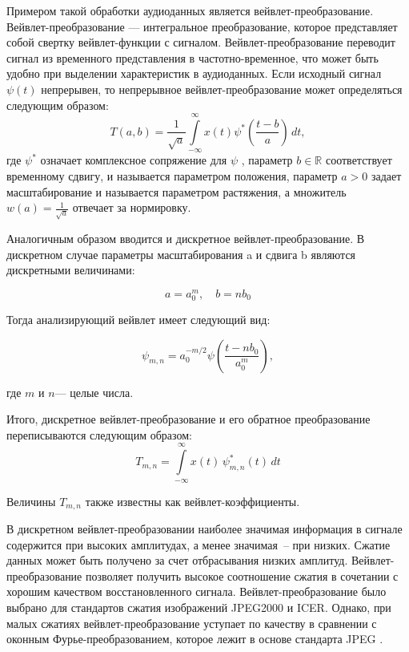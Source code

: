 Примером такой обработки аудиоданных является вейвлет-преобразование.
Вейвлет-преобразование — интегральное преобразование, которое представляет собой свертку вейвлет-функции с сигналом.
Вейвлет-преобразование переводит сигнал из временного представления в частотно-временное, что может быть удобно при выделении характеристик
в аудиоданных. Если исходный сигнал $\psi(t)$ непрерывен, то непрерывное вейвлет-преобразование может определяться
следующим образом:
\begin{equation}
	T(a,b)={\frac {1}{{\sqrt {a}}}}\int \limits _{{-\infty }}^{{\infty }}x(t)\psi ^{*}\left({\frac {t-b}{a}}\right)\,dt,
\end{equation} где
${\psi }^{*}$ означает комплексное сопряжение для $\psi$ , параметр $b\in \mathbb{R}$ соответствует временному сдвигу, 
и называется параметром положения, параметр $a > 0$ задает масштабирование и называется параметром растяжения, а множитель  ${w(a) = \frac{1}{\sqrt{a}}}$ отвечает за нормировку.

Аналогичным образом вводится и дискретное вейвлет-преобразование.
В дискретном случае параметры масштабирования a и сдвига b являются дискретными величинами:

$$a=a_{0}^{m},\quad b=nb_{0}$$

Тогда анализирующий вейвлет имеет следующий вид:

\begin{equation}
	\psi _{{m,n}}=a_{0}^{{-m/2}}\psi \left({\frac {t-nb_{0}}{a_{0}^{m}}}\right),
\end{equation}

где $m$ и $n$— целые числа.

Итого, дискретное вейвлет-преобразование и его обратное преобразование переписываются следующим образом:
\begin{equation}
	T_{{m,n}}=\int \limits _{{-\infty }}^{{\infty }}x(t)\,\psi _{{m,n}}^{*}(t)\,dt
\end{equation}

Величины $T_{{m,n}}$ также известны как вейвлет-коэффициенты.

В дискретном вейвлет-преобразовании наиболее значимая информация в сигнале содержится при высоких амплитудах, а менее значимая -- при низких.
Сжатие данных может быть получено за счет отбрасывания низких амплитуд.
Вейвлет-преобразование позволяет получить высокое соотношение сжатия в сочетании с хорошим качеством восстановленного сигнала. 
Вейвлет-преобразование было выбрано для стандартов сжатия изображений JPEG2000 и ICER.
Однако, при малых сжатиях вейвлет-преобразование уступает по качеству в сравнении с оконным Фурье-преобразованием, которое лежит в основе стандарта JPEG \cite{wavelet}. 

